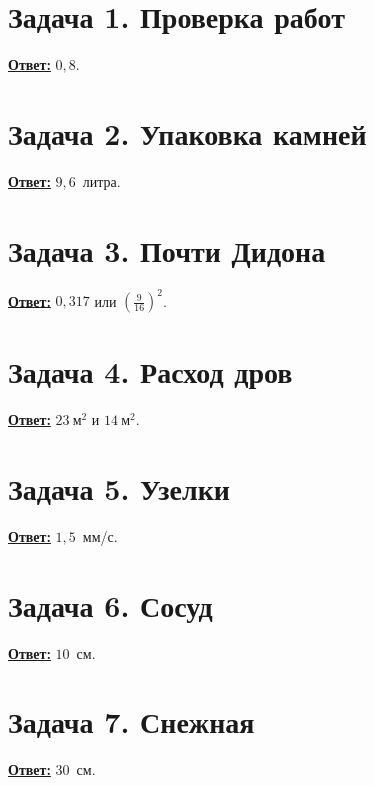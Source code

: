
%



\section{Задача 1. Проверка работ}
	\underline{\textbf{Ответ:}} $0{,}8$.
	
\section{Задача 2. Упаковка камней}
	\underline{\textbf{Ответ:}} $9{,}6$~литра.
	
\section{Задача 3. Почти Дидона}
	\underline{\textbf{Ответ:}} $0{,}317$ или $\left( \frac{9}{16} \right)^2$.
	
\section{Задача 4. Расход дров}
	\underline{\textbf{Ответ:}} $23~\text{м}^2$ и $14~\text{м}^2$.
	
\newpage
\section{Задача 5. Узелки}
	\underline{\textbf{Ответ:}} $1{,}5$~мм/с.
	
\section{Задача 6. Сосуд}
	\underline{\textbf{Ответ:}} $10$~см.
	
\section{Задача 7. Снежная}
	\underline{\textbf{Ответ:}} $30$~см.
	

